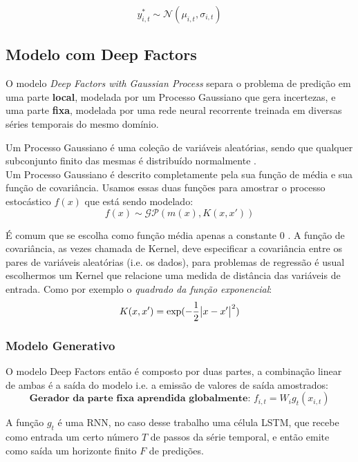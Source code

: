 \[
 y^*_{i,t} \sim \mathcal{N}(\mu_{i,t},\sigma_{i,t}) 
\]

\subsection{Modelo com Deep Factors}

O modelo \textit{Deep Factors with Gaussian Process} \citep{deepfactors} separa o problema de predição em uma parte \textbf{local}, modelada por um Processo Gaussiano que gera incertezas, e uma parte \textbf{fixa}, modelada por uma rede neural recorrente treinada em diversas séries temporais do mesmo domínio.


Um Processo Gaussiano é uma coleção de variáveis aleatórias,
sendo que qualquer subconjunto finito das mesmas é distribuído normalmente \citep{gpml}. \\

Um Processo Gaussiano é descrito completamente pela sua função de média e sua função de covariância. Usamos essas duas funções para amostrar o processo estocástico $f(x)$ que está sendo modelado: \\

\[
f(x) \sim \mathcal{GP}( m(x), K(x,x'))
\]

É comum que se escolha como função média apenas a constante 0 \citep{gpml}.  A função de covariância, as vezes chamada de Kernel, deve especificar a covariância entre os pares de variáveis aleatórias (i.e. os dados), para problemas de regressão é usual escolhermos um Kernel que relacione uma medida de distância das variáveis de entrada. Como por exemplo o \textit{quadrado da função exponencial}: \\

\[
  K(x,x') = \exp(-\frac{1}{2}\abs{x - x'}^2)
\]


\subsubsection{Modelo Generativo}

O modelo Deep Factors então é composto por duas partes, a combinação linear de ambas é a saída do modelo i.e. a emissão de valores de saída amostrados: \\

\[
  \textbf{Gerador da parte fixa aprendida globalmente: }  f_{i,t} = W_ig_t(x_{i,t})
\]

A função $g_t$ é uma RNN, no caso desse trabalho uma célula LSTM, que recebe como entrada um certo número $T$ de passos da série temporal, e então emite como saída um horizonte finito $F$ de predições.


